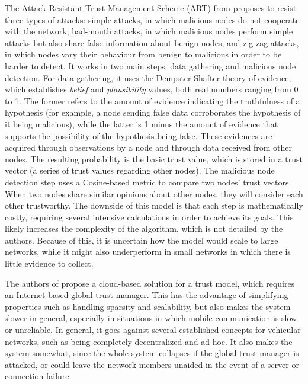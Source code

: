 The Attack-Resistant Trust Management Scheme (ART) from \citep{li2016art} proposes to resist three types of attacks: 
simple attacks, in which malicious nodes do not cooperate with the network;
bad-mouth attacks, in which malicious nodes perform simple attacks but also share false information about benign nodes;
and zig-zag attacks, in which nodes vary their behaviour from benign to malicious in order to be harder to detect.
It works in two main steps: data gathering and malicious node detection.
For data gathering, it uses the Dempster-Shafter theory of evidence, which establishes \textit{belief} and \textit{plausibility} values, both real numbers ranging from 0 to 1.
The former refers to the amount of evidence indicating the truthfulness of a hypothesis (for example, a node sending false data corroborates the hypothesis of it being malicious), while the latter is 1 minus the amount of evidence that supports the possibility of the hypothesis being false.
These evidences are acquired through observations by a node and through data received from other nodes.
The resulting probability is the basic trust value, which is stored in a trust vector (a series of trust values regarding other nodes).
The malicious node detection step uses a Cosine-based metric to compare two nodes' trust vectors.
When two nodes share similar opinions about other nodes, they will consider each other trustworthy.
The downside of this model is that each step is mathematically costly, requiring several intensive calculations in order to achieve its goals.
This likely increases the complexity of the algorithm, which is not detailed by the authors.
Because of this, it is uncertain how the model would scale to large networks, while it might also underperform in small networks in which there is little evidence to collect.

The authors of \citep{chen2017cloud} propose a cloud-based solution for a trust model, which requires an Internet-based global trust manager.
This has the advantage of simplifying properties such as handling sparsity and scalability, but also makes the system slower in general, especially in situations in which mobile communication is slow or unreliable.
In general, it goes against several established concepts for vehicular networks, such as being completely decentralized and ad-hoc.
It also makes the system somewhat, since the whole system collapses if the global trust manager is attacked, or could leave the network members unaided in the event of a server or connection failure.


